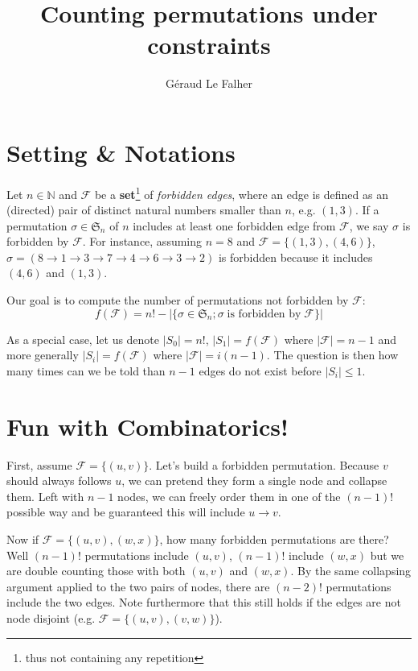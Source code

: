 \documentclass[a4paper,final,notitlepage,11pt,svgnames]{scrartcl}
\title{Counting permutations under constraints}
\author{Géraud Le Falher}
\newcommand{\inci}{\ensuremath{\mathcal{F}}}
\begin{document}
\maketitle

\section*{Setting \& Notations}

Let $n \in \mathbb{N}$ and $\inci{}$ be a \textbf{set}\footnote{thus not
containing any repetition} of \emph{forbidden edges}, where an edge is defined
as an (directed) pair of distinct natural numbers smaller than $n$, e.g.  $(1,
3)$. If a permutation $\sigma \in \mathfrak{S}_n$ of $n$ includes at least one
forbidden edge from \inci{}, we say $\sigma$ is forbidden by \inci{}.  For
instance, assuming $n=8$ and $\inci{} = \{(1,3), (4,6)\}$, $\sigma =
(8 \rightarrow 1 \rightarrow 3 \rightarrow 7 \rightarrow 4 \rightarrow 6
\rightarrow 3 \rightarrow 2)$ is forbidden because it includes $(4,6)$ and $(1, 3)$.

Our goal is to compute the number of permutations not forbidden by \inci{}: \[
f(\inci{}) = n! - \left|\{\sigma \in \mathfrak{S}_n; \sigma \; \text{is forbidden
by}\; \inci{}\}\right| \]

As a special case, let us denote $|S_0| = n!$, $|S_1| = f(\inci{})$ where
$|\inci{}| = n-1$ and more generally $|S_i| = f(\inci{})$ where $|\inci{}| =
i(n-1)$. The question is then how many times can we be told than $n-1$ edges do
not exist before $|S_i| \leq 1$.

\section*{Fun with Combinatorics!}

First, assume $\inci{} = \{(u,v)\}$. Let's build a forbidden permutation.
Because $v$ should always follows $u$, we can pretend they form a single node
and collapse them. Left with $n-1$ nodes, we can freely order them in one of
the $(n-1)!$ possible way and be guaranteed this will include $u \rightarrow
v$.

Now if $\inci{} = \{(u,v), (w,x)\}$, how many forbidden permutations are there?
Well $(n-1)!$ permutations include $(u,v)$, $(n-1)!$ include $(w, x)$ but we
are double counting those with both $(u,v)$ and $(w,x)$. By the same collapsing
argument applied to the two pairs of nodes, there are $(n-2)!$ permutations
include the two edges. Note furthermore that this still holds if the edges are
not node disjoint (e.g. $\inci{} = \{(u,v), (v,w)\}$).
\end{document}
